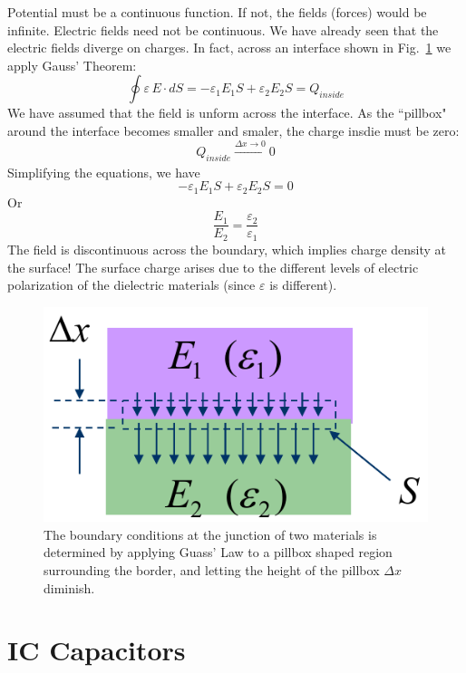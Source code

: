 Potential must be a continuous function. If not, the fields (forces) would be infinite.  
 Electric fields need not be continuous. We have already seen that the electric fields diverge on charges. In fact, across an interface shown in Fig.~\ref{fig:mod2-2_ICtech_sld_16} we apply Gauss' Theorem: 
\begin{equation} 
	\oint {\varepsilon \,E \cdot dS =  - {\varepsilon _1}{E_1}S + {\varepsilon _2}{E_2}S = {Q_{inside}}}  
\end{equation}
%
We have assumed that the field is unform across the interface.  As the ``pillbox" around the interface becomes smaller and smaler, the charge insdie must be zero:
%
\begin{equation} 
	Q_{inside} \xrightarrow[]{\Delta x \rightarrow 0} 0 
\end{equation}
%
Simplifying the equations, we have 
\begin{equation}  
	- {\varepsilon _1}{E_1}S + {\varepsilon _2}{E_2}S = 0
\end{equation}
Or
\begin{equation} 
	\frac{{{E_1}}}{{{E_2}}} = \frac{{{\varepsilon _2}}}{{{\varepsilon _1}}} 
\end{equation}
%
The field is discontinuous across the boundary, which implies charge density at the surface!  The surface charge arises due to the different levels of electric polarization of the dielectric materials (since $\varepsilon$ is different).



\begin{figure}[tb]
\begin{center}
\includegraphics[width=.35\columnwidth]{mod2-2_ICtech_sld_16}
\end{center}
\caption{The boundary conditions at the junction of two materials is determined by applying Guass' Law to a pillbox shaped region surrounding the border, and letting the height of the pillbox $\Delta x$ diminish.} \label{fig:mod2-2_ICtech_sld_16}
\end{figure}



 


\section{IC Capacitors}




